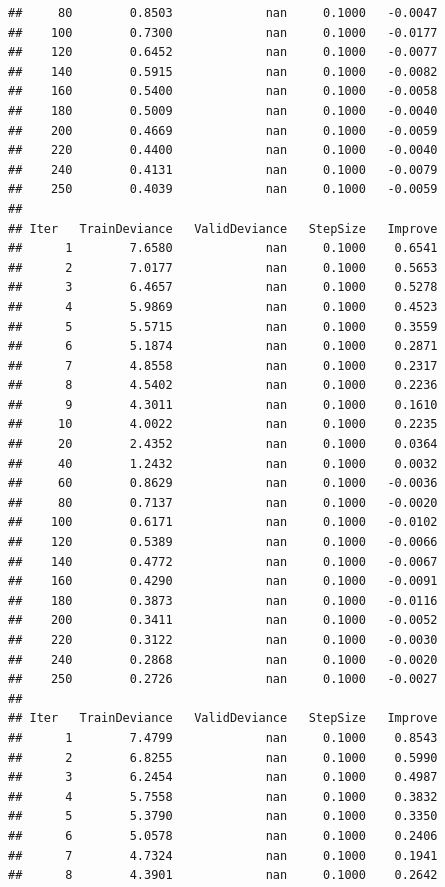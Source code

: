 \documentclass[
]{book}
\begin{document}
\begin{verbatim}
##     80        0.8503             nan     0.1000   -0.0047
##    100        0.7300             nan     0.1000   -0.0177
##    120        0.6452             nan     0.1000   -0.0077
##    140        0.5915             nan     0.1000   -0.0082
##    160        0.5400             nan     0.1000   -0.0058
##    180        0.5009             nan     0.1000   -0.0040
##    200        0.4669             nan     0.1000   -0.0059
##    220        0.4400             nan     0.1000   -0.0040
##    240        0.4131             nan     0.1000   -0.0079
##    250        0.4039             nan     0.1000   -0.0059
## 
## Iter   TrainDeviance   ValidDeviance   StepSize   Improve
##      1        7.6580             nan     0.1000    0.6541
##      2        7.0177             nan     0.1000    0.5653
##      3        6.4657             nan     0.1000    0.5278
##      4        5.9869             nan     0.1000    0.4523
##      5        5.5715             nan     0.1000    0.3559
##      6        5.1874             nan     0.1000    0.2871
##      7        4.8558             nan     0.1000    0.2317
##      8        4.5402             nan     0.1000    0.2236
##      9        4.3011             nan     0.1000    0.1610
##     10        4.0022             nan     0.1000    0.2235
##     20        2.4352             nan     0.1000    0.0364
##     40        1.2432             nan     0.1000    0.0032
##     60        0.8629             nan     0.1000   -0.0036
##     80        0.7137             nan     0.1000   -0.0020
##    100        0.6171             nan     0.1000   -0.0102
##    120        0.5389             nan     0.1000   -0.0066
##    140        0.4772             nan     0.1000   -0.0067
##    160        0.4290             nan     0.1000   -0.0091
##    180        0.3873             nan     0.1000   -0.0116
##    200        0.3411             nan     0.1000   -0.0052
##    220        0.3122             nan     0.1000   -0.0030
##    240        0.2868             nan     0.1000   -0.0020
##    250        0.2726             nan     0.1000   -0.0027
## 
## Iter   TrainDeviance   ValidDeviance   StepSize   Improve
##      1        7.4799             nan     0.1000    0.8543
##      2        6.8255             nan     0.1000    0.5990
##      3        6.2454             nan     0.1000    0.4987
##      4        5.7558             nan     0.1000    0.3832
##      5        5.3790             nan     0.1000    0.3350
##      6        5.0578             nan     0.1000    0.2406
##      7        4.7324             nan     0.1000    0.1941
##      8        4.3901             nan     0.1000    0.2642

\end{verbatim}
\end{document}
